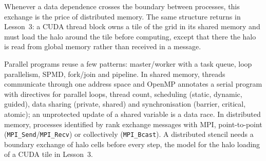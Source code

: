 \documentclass[../main.tex]{subfiles}
\begin{document}
Whenever a data dependence crosses the boundary between processes, this
exchange is the price of distributed memory.  The same structure returns
in Lesson~3: a CUDA thread block owns a tile of the grid in its shared
memory and must load the halo around the tile before computing, except
that there the halo is read from global memory rather than received in a
message.

\begin{keypoint}
  Parallel programs reuse a few patterns: master/worker with a task
  queue, loop parallelism, SPMD, fork/join and pipeline.  In shared
  memory, threads communicate through one address space and OpenMP
  annotates a serial program with directives for parallel loops, thread
  count, scheduling (static, dynamic, guided), data sharing (private,
  shared) and synchronisation (barrier, critical, atomic); an unprotected
  update of a shared variable is a data race.  In distributed memory,
  processes identified by rank exchange messages with MPI, point-to-point
  (\texttt{MPI\_Send}/\texttt{MPI\_Recv}) or collectively
  (\texttt{MPI\_Bcast}).  A distributed stencil needs a boundary exchange
  of halo cells before every step, the model for the halo loading of a
  CUDA tile in Lesson~3.
\end{keypoint}
\end{document}

